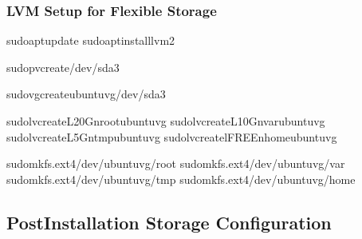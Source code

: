 \documentclass[letterpaper,10pt,english]{sphinxmanual}
\begin{document}
\subsubsection{LVM Setup for Flexible Storage}
\label{\detokenize{ubuntu-setup:lvm-setup-for-flexible-storage}}
\begin{sphinxVerbatim}[commandchars=\\\{\}]
sudoaptupdate
sudoaptinstalllvm2

sudopvcreate/dev/sda3

sudovgcreateubuntu\PYGZhy{}vg/dev/sda3

sudolvcreate\PYGZhy{}L20G\PYGZhy{}nrootubuntu\PYGZhy{}vg
sudolvcreate\PYGZhy{}L10G\PYGZhy{}nvarubuntu\PYGZhy{}vg
sudolvcreate\PYGZhy{}L5G\PYGZhy{}ntmpubuntu\PYGZhy{}vg
sudolvcreate\PYGZhy{}l\PYGZpc{}FREE\PYGZhy{}nhomeubuntu\PYGZhy{}vg

sudomkfs.ext4/dev/ubuntu\PYGZhy{}vg/root
sudomkfs.ext4/dev/ubuntu\PYGZhy{}vg/var
sudomkfs.ext4/dev/ubuntu\PYGZhy{}vg/tmp
sudomkfs.ext4/dev/ubuntu\PYGZhy{}vg/home
\end{sphinxVerbatim}


\subsection{Post\sphinxhyphen{}Installation Storage Configuration}
\label{\detokenize{ubuntu-setup:post-installation-storage-configuration}}
\end{document}
